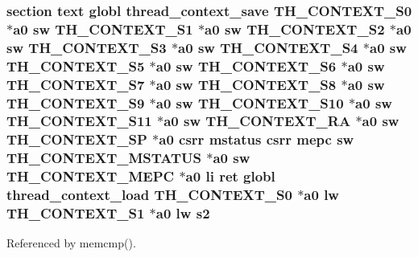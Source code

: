 \hypertarget{riscv_2kpanica_8S_a08f4a1bf17498bc7df004b0c8b93cff1}{
\subsubsection[{s2}]{\setlength{\rightskip}{0pt plus 5cm}section text globl {\bf thread\-\_\-context\-\_\-save} {\bf T\-H\-\_\-\-C\-O\-N\-T\-E\-X\-T\-\_\-\-S0} $\ast${\bf a0} {\bf sw} {\bf T\-H\-\_\-\-C\-O\-N\-T\-E\-X\-T\-\_\-\-S1} $\ast${\bf a0} {\bf sw} {\bf T\-H\-\_\-\-C\-O\-N\-T\-E\-X\-T\-\_\-\-S2} $\ast${\bf a0} {\bf sw} {\bf T\-H\-\_\-\-C\-O\-N\-T\-E\-X\-T\-\_\-\-S3} $\ast${\bf a0} {\bf sw} {\bf T\-H\-\_\-\-C\-O\-N\-T\-E\-X\-T\-\_\-\-S4} $\ast${\bf a0} {\bf sw} {\bf T\-H\-\_\-\-C\-O\-N\-T\-E\-X\-T\-\_\-\-S5} $\ast${\bf a0} {\bf sw} {\bf T\-H\-\_\-\-C\-O\-N\-T\-E\-X\-T\-\_\-\-S6} $\ast${\bf a0} {\bf sw} {\bf T\-H\-\_\-\-C\-O\-N\-T\-E\-X\-T\-\_\-\-S7} $\ast${\bf a0} {\bf sw} {\bf T\-H\-\_\-\-C\-O\-N\-T\-E\-X\-T\-\_\-\-S8} $\ast${\bf a0} {\bf sw} {\bf T\-H\-\_\-\-C\-O\-N\-T\-E\-X\-T\-\_\-\-S9} $\ast${\bf a0} {\bf sw} {\bf T\-H\-\_\-\-C\-O\-N\-T\-E\-X\-T\-\_\-\-S10} $\ast${\bf a0} {\bf sw} {\bf T\-H\-\_\-\-C\-O\-N\-T\-E\-X\-T\-\_\-\-S11} $\ast${\bf a0} {\bf sw} {\bf T\-H\-\_\-\-C\-O\-N\-T\-E\-X\-T\-\_\-\-R\-A} $\ast${\bf a0} {\bf sw} {\bf T\-H\-\_\-\-C\-O\-N\-T\-E\-X\-T\-\_\-\-S\-P} $\ast${\bf a0} csrr {\bf mstatus} csrr {\bf mepc} {\bf sw} {\bf T\-H\-\_\-\-C\-O\-N\-T\-E\-X\-T\-\_\-\-M\-S\-T\-A\-T\-U\-S} $\ast${\bf a0} {\bf sw} {\bf T\-H\-\_\-\-C\-O\-N\-T\-E\-X\-T\-\_\-\-M\-E\-P\-C} $\ast${\bf a0} {\bf li} ret globl {\bf thread\-\_\-context\-\_\-load} {\bf T\-H\-\_\-\-C\-O\-N\-T\-E\-X\-T\-\_\-\-S0} $\ast${\bf a0} {\bf lw} {\bf T\-H\-\_\-\-C\-O\-N\-T\-E\-X\-T\-\_\-\-S1} $\ast${\bf a0} {\bf lw} s2}}\label{riscv_2kpanica_8S_a08f4a1bf17498bc7df004b0c8b93cff1}


Referenced by memcmp().

